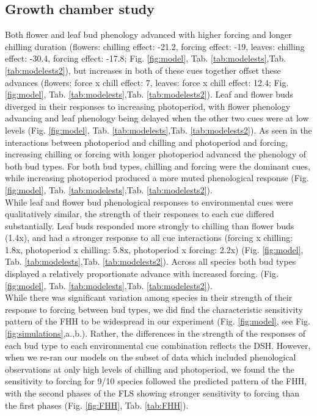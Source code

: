 \documentclass[11pt]{article}\usepackage[]{graphicx}\usepackage[]{color}
\begin{document}
\subsection*{Growth chamber study} 
\noindent  Both flower and leaf bud phenology advanced with higher forcing and longer chilling duration (flowers: chilling effect: -21.2, forcing effect: -19, leaves: chilling effect: -30.4, forcing effect: -17.8; Fig. \ref{fig:model}, Tab. \ref{tab:modelests},Tab. \ref{tab:modelests2}), but increases in both of these cues together offset these advances (flowers: force x chill effect: 7, leaves: force x chill effect: 12.4; Fig. \ref{fig:model}, Tab. \ref{tab:modelests},Tab. \ref{tab:modelests2}). Leaf and flower buds diverged in their responses to increasing photoperiod, with flower phenology advancing and leaf phenology being delayed when the other two cues were at low levels (Fig. \ref{fig:model}, Tab. \ref{tab:modelests},Tab. \ref{tab:modelests2}). As seen in the interactions between photoperiod and chilling and photoperiod and forcing, increasing chilling or forcing with longer photoperiod advanced the phenology of both bud types. For both bud types, chilling and forcing were the dominant cues, while increasing photoperiod produced a more muted phenological response (Fig. \ref{fig:model}, Tab. \ref{tab:modelests},Tab. \ref{tab:modelests2}). \\

\noindent While leaf and flower bud phenological responses to environmental cues were qualitatively similar, the strength of their responses to each cue differed substantially. Leaf buds responded more strongly to chilling than flower buds (1.4x), and had a stronger response to all cue interactions (forcing x chilling: 1.8x, photoperiod x chilling: 5.8x, photoperiod x forcing: 2.2x) (Fig. \ref{fig:model}, Tab. \ref{tab:modelests},Tab. \ref{tab:modelests2}). Across all species both bud types displayed a relatively proportionate advance with increased forcing. (Fig. \ref{fig:model}, Tab. \ref{tab:modelests},Tab. \ref{tab:modelests2}).\\

\noindent While there was significant variation among species in their strength of their response to forcing between bud types, we did find the characteristic sensitivity pattern of the FHH to be widespread in our experiment (Fig. \ref{fig:model}, see Fig. \ref{fig:simulations},a.,b.). Rather, the differences in the strength of the responses of each bud type to each environmental cue combination reflects the DSH. However, when we re-ran our models on the subset of data which included phenological observations at only high levels of chilling and photoperiod, we found the the sensitivity to forcing for 9/10 species followed the predicted pattern of the FHH, with the second phases of the FLS showing stronger sensitivity to forcing than the first phases (Fig. \ref{fig:FHH}, Tab. \ref{tab:FHH}).\\
\end{document}
